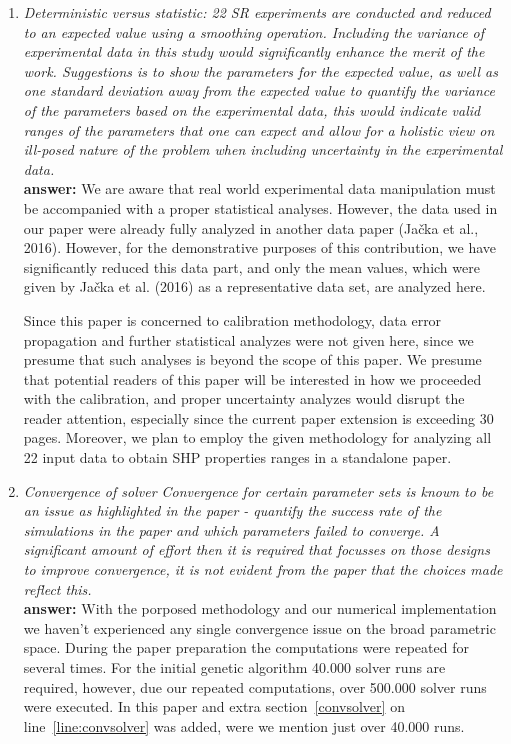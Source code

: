 \documentclass[final,3p]{elsarticle}
\begin{document}
\begin{enumerate}[label={\bf \Roman*}]
\item {\it Deterministic versus statistic:
 22 SR experiments are conducted and reduced to an expected value using a smoothing operation. Including the variance of experimental data in this study would significantly enhance the merit of the work. Suggestions is to show the parameters for the expected value, as well as one standard deviation away from the expected value to quantify the variance of the parameters based on the experimental data, this would indicate valid ranges of the parameters that one can expect and allow for a holistic view on ill-posed nature of the problem when including uncertainty in the experimental data.}\\
 {\bf answer:} We are aware that real world experimental data manipulation must be accompanied with a proper statistical analyses. However, the data used in our paper were already fully analyzed in another data paper (Ja\v{c}ka et al., 2016). However, for the demonstrative purposes of this contribution, we have significantly reduced this data part, and only the mean values, which were given by Ja\v{c}ka et al. (2016) as a representative data set, are analyzed here. 

Since this paper is concerned to calibration methodology, data error propagation and further statistical analyzes were not given here, since we presume that such analyses is beyond the scope of this paper. We presume that potential readers of this paper will be interested in how we proceeded with the calibration, and proper uncertainty analyzes would disrupt the reader attention, especially since the current paper extension is exceeding 30 pages. Moreover, we plan to employ the given methodology for analyzing all 22 input data to obtain SHP properties ranges in a standalone paper.

\item {\it Convergence of solver
 Convergence for certain parameter sets is known to be an issue as highlighted in the paper - quantify the success rate of the simulations in the paper and which parameters failed to converge. A significant amount of effort then it is required that focusses on those designs to improve convergence, it is not evident from the paper that the choices made reflect this.} \\
 {\bf answer:} With the porposed methodology and our numerical implementation we haven't experienced any single convergence issue on the broad parametric space. During the paper preparation the computations were repeated for several times. For the initial genetic algorithm 40.000 solver runs are required, however, due our repeated computations, over 500.000 solver runs were executed. In this paper and extra section~\ref{convsolver}  on line~\ref{line:convsolver} was added, were we mention just over 40.000 runs. 

\end{enumerate} 
\end{document}

